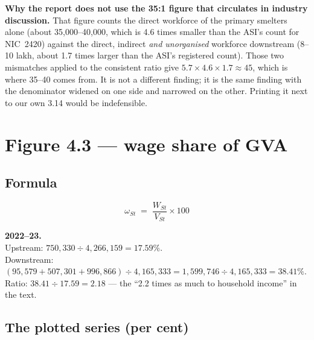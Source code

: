 \documentclass[11pt, a4paper]{article}
\begin{document}
\begin{caution}
\textbf{Why the report does not use the 35:1 figure that circulates in industry
discussion.} That figure counts the direct workforce of the primary smelters alone
(about 35{,}000--40{,}000, which is 4.6 times smaller than the ASI's count for
NIC~2420) against the direct, indirect \emph{and unorganised} workforce downstream
(8--10 lakh, about 1.7 times larger than the ASI's registered count). Those two
mismatches applied to the consistent ratio give
$5.7 \times 4.6 \times 1.7 \approx 45$, which is where 35--40 comes from. It is not a
different finding; it is the same finding with the denominator widened on one side and
narrowed on the other. Printing it next to our own 3.14 would be indefensible.
\end{caution}

\section{Figure 4.3 --- wage share of GVA}

\subsection{Formula}
\[
\omega_{St} \;=\; \frac{W_{St}}{V_{St}} \times 100
\]

\begin{work}
\textbf{2022--23.} \\
Upstream: $750{,}330 \div 4{,}266{,}159 = 17.59\%$. \\
Downstream: $(95{,}579 + 507{,}301 + 996{,}866) \div 4{,}165{,}333
= 1{,}599{,}746 \div 4{,}165{,}333 = 38.41\%$. \\[2pt]
Ratio: $38.41 \div 17.59 = 2.18$ --- the ``2.2 times as much to household income''
in the text.
\end{work}

\subsection{The plotted series (per cent)}

\begin{table}[H]
\centering\footnotesize
{}
\end{table}
\end{document}
